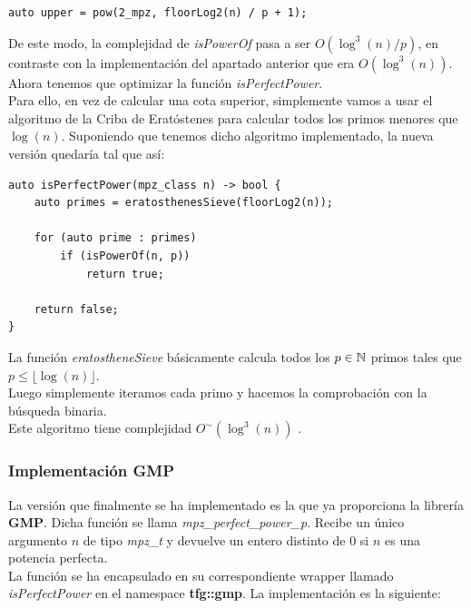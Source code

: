 \begin{lstlisting}
auto upper = pow(2_mpz, floorLog2(n) / p + 1);
\end{lstlisting}

De este modo, la complejidad de \textit{isPowerOf} pasa a ser $O(\log^3(n)/p)$, en contraste con la implementación del apartado anterior que era $O(\log^3(n))$. Ahora tenemos que optimizar la función \textit{isPerfectPower}.\\

Para ello, en vez de calcular una cota superior, simplemente vamos a usar el algoritmo de la Criba de Eratóstenes para calcular todos los primos menores que $\log(n)$. Suponiendo que tenemos dicho algoritmo implementado, la nueva versión quedaría tal que así:\\

\begin{lstlisting}
auto isPerfectPower(mpz_class n) -> bool {
	auto primes = eratosthenesSieve(floorLog2(n));
	
	for (auto prime : primes)
		if (isPowerOf(n, p))
			return true;
	
	return false;
}
\end{lstlisting}

La función \textit{eratostheneSieve} básicamente calcula todos los $p \in \mathbb{N}$ primos tales que $p \leq \lfloor \log(n) \rfloor$.\\

Luego simplemente iteramos cada primo y hacemos la comprobación con la búsqueda binaria.\\

Este algoritmo tiene complejidad $O^\sim(\log^3(n))$ \cite{bach_sorenson_1989}.

\subsubsection{Implementación GMP}

La versión que finalmente se ha implementado es la que ya proporciona la librería \textbf{GMP}. Dicha función se llama \textit{mpz\_perfect\_power\_p}. Recibe un único argumento $n$ de tipo \textit{mpz\_t} y devuelve un entero distinto de $0$ si $n$ es una potencia perfecta.\\

La función se ha encapsulado en su correspondiente wrapper llamado \textit{isPerfectPower} en el namespace \textbf{tfg::gmp}. La implementación es la siguiente:\\

